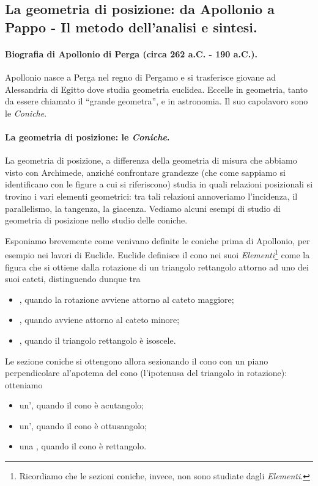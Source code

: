 \subsection{La geometria di posizione: da Apollonio a Pappo - Il metodo dell'analisi e sintesi.}\label{LaGeometriaDiPosizione}
\paragraph{Biografia di Apollonio di Perga (circa 262 a.C. - 190 a.C.).} Apollonio nasce a Perga nel regno di Pergamo e si trasferisce giovane ad Alessandria di Egitto dove studia geometria euclidea. Eccelle in geometria, tanto da essere chiamato il ``grande geometra'', e in astronomia. Il suo capolavoro sono le \textit{Coniche}.
\paragraph{La geometria di posizione: le \textit{Coniche}.} La geometria di posizione, a differenza della geometria di misura che abbiamo visto con Archimede, anzich\'e confrontare grandezze (che come sappiamo si identificano con le figure a cui si riferiscono) studia in quali relazioni posizionali si trovino i vari elementi geometrici: tra tali relazioni annoveriamo l'incidenza, il parallelismo, la tangenza, la giacenza. Vediamo alcuni esempi di studio di geometria di posizione nello studio delle coniche.
\par Esponiamo brevemente come venivano definite le coniche prima di Apollonio, per esempio nei lavori di Euclide. Euclide definisce il cono nei suoi \textit{Elementi}\footnote{Ricordiamo che le sezioni coniche, invece, non sono studiate dagli \textit{Elementi}.} come la figura che si ottiene dalla rotazione di un triangolo rettangolo attorno ad uno dei suoi cateti, distinguendo dunque tra
\begin{itemize}
	\item {}, quando la rotazione avviene attorno al cateto maggiore;
	\item {}, quando avviene attorno al cateto minore;
	\item {}, quando il triangolo rettangolo \`e isoscele.
\end{itemize}
Le sezione coniche si ottengono allora sezionando il cono con un piano perpendicolare al'apotema del cono (l'ipotenusa del triangolo in rotazione): otteniamo
\begin{itemize}
	\item un', quando il cono \`e acutangolo;
	\item un', quando il cono \`e ottusangolo;
	\item una , quando il cono \`e rettangolo.
\end{itemize}
